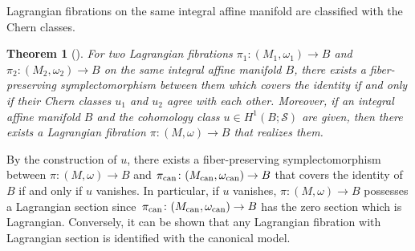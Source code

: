 \documentclass[pdftex]{sigma}
\numberwithin{equation}{section}
\newtheorem{Theorem}{Theorem}[section]
\newcommand{\SCS}{\mathscr S}
\begin{document}
Lagrangian fibrations on the same integral affine manifold are classified with the Chern classes.
\begin{Theorem}[\cite{Du}]\label{classification}
For two Lagrangian fibrations $\pi_1\colon (M_1,\omega_1)\to B$ and ${\pi_2\colon (M_2,\omega_2)\to B}$ on the same integral affine manifold $B$, there exists a fiber-preserving symplectomorphism between them which covers the identity if and only if their Chern classes $u_1$ and $u_2$ agree with each other. Moreover, if an integral affine manifold $B$ and the cohomology class $u\in H^1(B;\SCS)$ are given, then there exists a Lagrangian fibration $\pi\colon (M,\omega)\to B$ that realizes them.
\end{Theorem}
\begin{Remark}
By the construction of $u$, there exists a fiber-preserving symplectomorphism between $\pi \colon (M,\omega)\to B$ and $\pi_{\rm can}\colon (M_{\rm can},\omega_{\rm can})\to B$ that covers the identity of $B$ if and only if $u$ vanishes. In particular, if $u$ vanishes, $\pi \colon (M,\omega)\to B$ possesses a Lagrangian section since~${\pi_{\rm can}\colon (M_{\rm can},\omega_{\rm can})\to B}$ has the zero section which is Lagrangian. Conversely, it can be shown that any Lagrangian fibration with Lagrangian section is identified with the canonical model.
\end{Remark}
\end{document}
